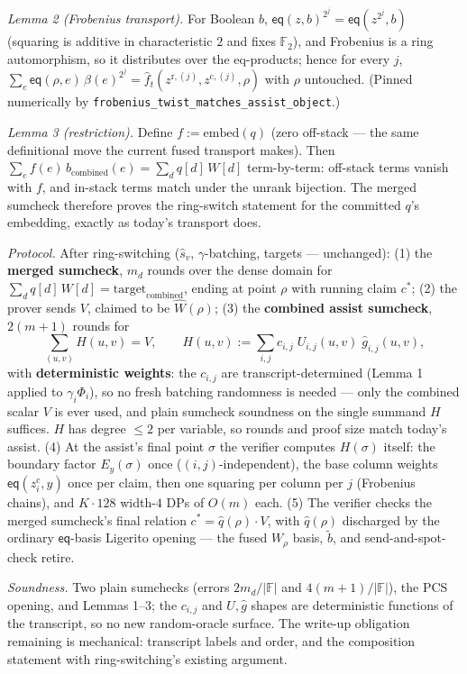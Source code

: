 \documentclass[11pt]{article}
\newcommand{\F}{\mathbb{F}}                       %
\newcommand{\eq}{\mathsf{eq}}
\newcommand{\code}[1]{\texttt{#1}}
\theoremstyle{definition}
\begin{document}
\emph{Lemma 2 (Frobenius transport).} For Boolean $b$,
$\eq(z, b)^{2^j} = \eq(z^{2^j}, b)$ (squaring is additive in
characteristic $2$ and fixes $\F_2$), and Frobenius is a ring
automorphism, so it distributes over the eq-products; hence for every
$j$,
$\sum_e \eq(\rho, e)\,\beta(e)^{2^j} =
 \hat f_t(z^{\mathrm{r},(j)}, z^{\mathrm{c},(j)}, \rho)$
with $\rho$ untouched. (Pinned numerically by
\code{frobenius\_twist\_matches\_assist\_object}.)

\emph{Lemma 3 (restriction).} Define $f := \mathrm{embed}(q)$ (zero
off-stack --- the same definitional move the current fused transport
makes). Then $\sum_e f(e)\,b_{\mathrm{combined}}(e) =
\sum_d q[d]\,W[d]$ term-by-term: off-stack terms vanish with $f$, and
in-stack terms match under the unrank bijection. The merged sumcheck
therefore proves the ring-switch statement for the committed $q$'s
embedding, exactly as today's transport does.

\emph{Protocol.} After ring-switching ($\hat s_v$, $\gamma$-batching,
targets --- unchanged): (1) the \textbf{merged sumcheck}, $m_d$ rounds
over the dense domain for $\sum_d q[d]\,W[d] =
\mathrm{target}_{\mathrm{combined}}$, ending at point $\rho$ with
running claim $c^\ast$; (2) the prover sends $V$, claimed to be
$\widehat W(\rho)$; (3) the \textbf{combined assist sumcheck},
$2(m{+}1)$ rounds for
\[
  \textstyle\sum_{(u,v)} H(u,v) = V,
  \qquad
  H(u,v) := \sum_{i,j} c_{i,j}\; U_{i,j}(u,v)\;\hat g_{i,j}(u,v),
\]
with \textbf{deterministic weights}: the $c_{i,j}$ are
transcript-determined (Lemma 1 applied to $\gamma_i\Phi_i$), so no
fresh batching randomness is needed --- only the combined scalar $V$
is ever used, and plain sumcheck soundness on the single summand $H$
suffices. $H$ has degree $\le 2$ per variable, so rounds and proof
size match today's assist. (4) At the assist's final point $\sigma$
the verifier computes $H(\sigma)$ itself: the boundary factor
$E_y(\sigma)$ once ($(i,j)$-independent), the base column weights
$\eq(z_i^{\mathrm{c}}, y)$ once per claim, then one squaring per
column per $j$ (Frobenius chains), and $K \cdot 128$ width-$4$ DPs of
$O(m)$ each. (5) The verifier checks the merged sumcheck's final
relation $c^\ast = \hat q(\rho) \cdot V$, with $\hat q(\rho)$
discharged by the ordinary $\eq$-basis Ligerito opening ---
the fused $W_\rho$ basis, $\tilde b$, and send-and-spot-check retire.

\emph{Soundness.} Two plain sumchecks (errors
$2 m_d / |\F|$ and $4(m{+}1)/|\F|$), the PCS opening, and Lemmas 1--3;
the $c_{i,j}$ and $U, \hat g$ shapes are deterministic functions of
the transcript, so no new random-oracle surface. The write-up
obligation remaining is mechanical: transcript labels and order, and
the composition statement with ring-switching's existing argument.
\end{document}
